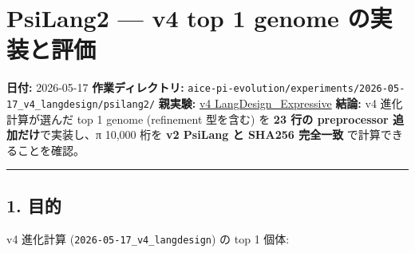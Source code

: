 \documentclass[
]{ltjsarticle}
\author{}
\date{}
\begin{document}
{
\setcounter{tocdepth}{2}
\tableofcontents
}
\section{PsiLang2 --- v4 top 1 genome
の実装と評価}\label{psilang2-v4-top-1-genome-ux306eux5b9fux88c5ux3068ux8a55ux4fa1}

\textbf{日付:} 2026-05-17 \textbf{作業ディレクトリ:}
\texttt{aice-pi-evolution/experiments/2026-05-17\_v4\_langdesign/psilang2/}
\textbf{親実験:} \href{../REPORT.md}{v4 LangDesign\_Expressive}
\textbf{結論:} v4 進化計算が選んだ top 1 genome (refinement 型を含む) を
\textbf{23 行の preprocessor 追加だけ}で実装し、π 10,000 桁を \textbf{v2
PsiLang と SHA256 完全一致} で計算できることを確認。

\begin{center}\rule{0.5\linewidth}{0.5pt}\end{center}

\subsection{1. 目的}\label{ux76eeux7684}

v4 進化計算 (\texttt{2026-05-17\_v4\_langdesign}) の top 1 個体:
\end{document}
